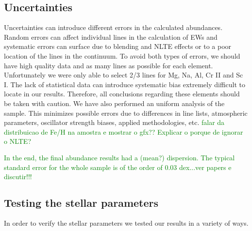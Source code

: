 \documentclass[dvips,12pt,a4paper]{report}
\begin{document}
{{\subsection {Uncertainties}
\label{uncertain}
Uncertainties can introduce different errors in the calculated abundances. Random errors can affect individual lines in the calculation of EWs and systematic errors can surface due to blending and NLTE effects or to a poor location of the lines in the continuum. To avoid both types of errors, we should have high quality data and as many lines as possible for each element. Unfortunately we were only able to select 2/3 lines for Mg, Na, Al, Cr II and Sc I. The lack of statistical data can introduce systematic bias extremely difficult to locate in our results. Therefore, all conclusions regarding these elements should be taken with caution. We have also performed an uniform analysis of the sample. This minimizes possible errors due to differences in line lists, atmospheric parameters, oscillator strength biases, applied methodologies, etc. 
\textcolor{green}{falar da distribuicao de Fe/H na amostra e mostrar o gfx?? Explicar o porque de ignorar o NLTE? }

\textcolor{green}{In the end, the final abundance results had a (mean?) dispersion. The typical standard error for the whole sample is of the order of 0.03 dex...ver papers e discutir!!!} 

\subsection {Testing the stellar parameters}

In order to verify the stellar parameters we tested our results in a variety of ways. 

}}
\end{document}
